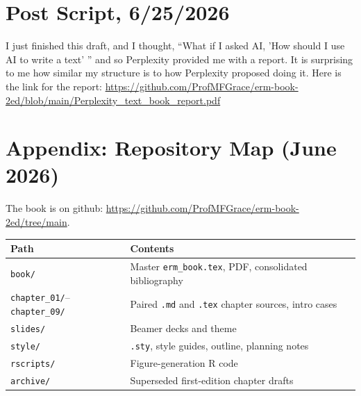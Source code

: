 \documentclass[11pt,letterpaper]{article}
\begin{document}
\section{Post Script, 6/25/2026}
I just finished this draft, and I thought, ``What if I asked AI, 'How should I use AI to write a text' '' and so  Perplexity provided me with a report.  It is surprising to me how similar my structure is to how Perplexity proposed doing it. Here is the link for the report: \url{https://github.com/ProfMFGrace/erm-book-2ed/blob/main/Perplexity_text_book_report.pdf}

\section*{Appendix: Repository Map (June 2026)}
The book is on github: \url{https://github.com/ProfMFGrace/erm-book-2ed/tree/main}. \\

\small
\begin{tabular}{@{}ll@{}}
\toprule
\textbf{Path} & \textbf{Contents} \\
\midrule
\texttt{book/} & Master \texttt{erm\_book.tex}, PDF, consolidated bibliography \\
\texttt{chapter\_01/}--\texttt{chapter\_09/} & Paired \texttt{.md} and \texttt{.tex} chapter sources, intro cases \\
\texttt{slides/} & Beamer decks and theme \\
\texttt{style/} & \texttt{.sty}, style guides, outline, planning notes \\
\texttt{rscripts/} & Figure-generation R code \\
\texttt{archive/} & Superseded first-edition chapter drafts \\
\bottomrule
\end{tabular}

\normalsize

\nocite{*}


\end{document}
